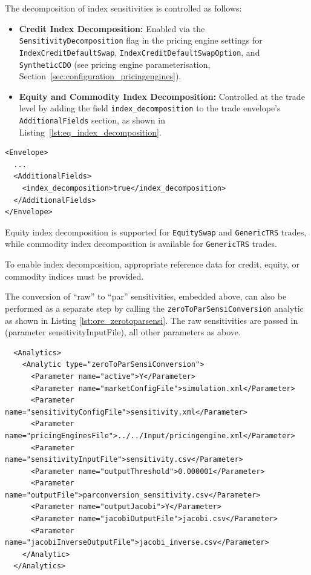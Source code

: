 The decomposition of index sensitivities is controlled as follows:

\begin{itemize}
    \item \textbf{Credit Index Decomposition:} Enabled via the \texttt{SensitivityDecomposition} flag in the pricing engine settings for \texttt{IndexCreditDefaultSwap}, \texttt{IndexCreditDefaultSwapOption}, and \texttt{SyntheticCDO} (see pricing engine parameterisation, Section~\ref{sec:configuration_pricingengines}).
    \item \textbf{Equity and Commodity Index Decomposition:} Controlled at the trade level by adding the field \texttt{index\_decomposition} to the trade envelope's \texttt{AdditionalFields} section, as shown in Listing~\ref{lst:eq_index_decomposition}.
\end{itemize}

\begin{listing}[H]
\begin{verbatim}
<Envelope>
  ...
  <AdditionalFields>
    <index_decomposition>true</index_decomposition>
  </AdditionalFields>
</Envelope>
\end{verbatim}
\caption{Trade envelope configuration for equity and commodity index decomposition}
\label{lst:eq_index_decomposition}
\end{listing}

Equity index decomposition is supported for \texttt{EquitySwap} and \texttt{GenericTRS} trades, while commodity index decomposition is available for \texttt{GenericTRS} trades.

To enable index decomposition, appropriate reference data for credit, equity, or commodity indices must be provided.

The conversion of ``raw'' to ``par'' sensitivities, embedded above, can also be performed as a
separate step by calling the {\tt zeroToParSensiConversion} analytic as shown in Listing
\ref{lst:ore_zerotoparsensi}. The raw sensitivities are passed in (parameter sensitivityInputFile),
all other parameters as above.

\begin{listing}[H]
\begin{verbatim}
  <Analytics>
    <Analytic type="zeroToParSensiConversion">
      <Parameter name="active">Y</Parameter>
      <Parameter name="marketConfigFile">simulation.xml</Parameter>
      <Parameter name="sensitivityConfigFile">sensitivity.xml</Parameter>
      <Parameter name="pricingEnginesFile">../../Input/pricingengine.xml</Parameter>
      <Parameter name="sensitivityInputFile">sensitivity.csv</Parameter>
      <Parameter name="outputThreshold">0.000001</Parameter>
      <Parameter name="outputFile">parconversion_sensitivity.csv</Parameter>
      <Parameter name="outputJacobi">Y</Parameter>
      <Parameter name="jacobiOutputFile">jacobi.csv</Parameter>
      <Parameter name="jacobiInverseOutputFile">jacobi_inverse.csv</Parameter>
    </Analytic>
  </Analytics>
\end{verbatim}
\caption{ORE analytic: Par Conversion}
\label{lst:ore_zerotoparsensi}
\end{listing}

